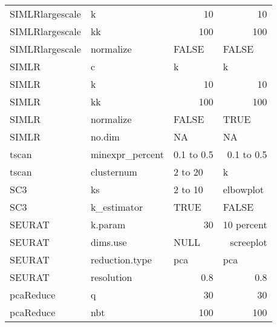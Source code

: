 \documentclass[12pt, a4paper]{article}\usepackage[]{graphicx}\usepackage[]{color}
\begin{document}
\begin{table}[htbp]
\begin{tabular}{llrr}
SIMLRlargescale & k     & 10    & 10 \\
SIMLRlargescale & kk    & 100   & 100 \\
SIMLRlargescale & normalize & \multicolumn{1}{l}{FALSE} & \multicolumn{1}{l}{FALSE} \\
SIMLR & c     & \multicolumn{1}{l}{k} & \multicolumn{1}{l}{k} \\
SIMLR & k     & 10    & 10 \\
SIMLR & kk    & 100   & 100 \\
SIMLR & normalize & \multicolumn{1}{l}{FALSE} & \multicolumn{1}{l}{TRUE} \\
SIMLR & no.dim & \multicolumn{1}{l}{NA} & \multicolumn{1}{l}{NA} \\
tscan & minexpr\_percent & \multicolumn{1}{p{7.25em}}{0.1 to 0.5} & \multicolumn{1}{p{10.835em}}{0.1 to 0.5} \\
tscan & clusternum & \multicolumn{1}{l}{2 to 20} & \multicolumn{1}{l}{k} \\
SC3   & ks    & \multicolumn{1}{l}{2 to 10} & \multicolumn{1}{l}{elbowplot} \\
SC3   & k\_estimator & \multicolumn{1}{l}{TRUE} & \multicolumn{1}{l}{FALSE} \\
SEURAT & k.param & 30    & \multicolumn{1}{l}{10 percent} \\
SEURAT & dims.use & \multicolumn{1}{l}{NULL} & \multicolumn{1}{p{10.835em}}{screeplot} \\
SEURAT & reduction.type & \multicolumn{1}{l}{pca} & \multicolumn{1}{l}{pca} \\
SEURAT & resolution  & 0.8   & 0.8 \\
pcaReduce & q     & 30    & 30 \\
pcaReduce & nbt   & 100   & 100 \\
\end{tabular}%
\label{tab:addlabel}%
\end{table}%
\end{document}
